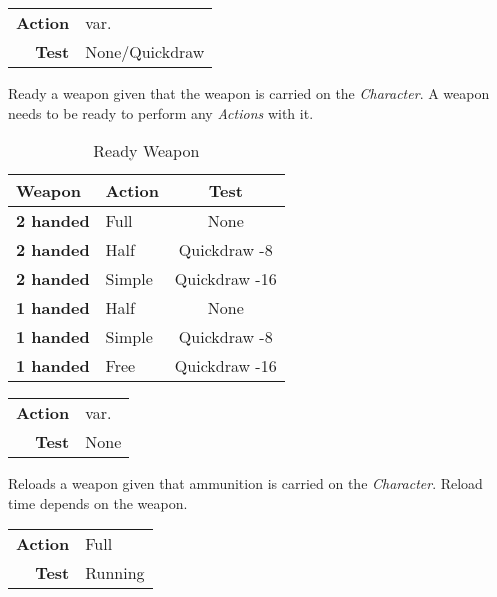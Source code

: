 \begin{tabular}{rl}
    \textbf{Action} & var.           \\
    \textbf{Test}   & None/Quickdraw \\
\end{tabular}

\hfill

Ready a weapon given that the weapon is carried on the \emph{Character}.
A weapon needs to be ready to perform any \emph{Actions} with it.

\begin{table}[htb]
    \caption[Ready Weapon]{Ready Weapon}
    \label{tab:ready weapon}
    \centering
    \begin{tabular}{llc}
        \toprule
        \textbf{Weapon}   & \textbf{Action} & \textbf{Test} \\
        \midrule
        \textbf{2 handed} & Full            & None          \\
        \textbf{2 handed} & Half            & Quickdraw -8  \\
        \textbf{2 handed} & Simple          & Quickdraw -16 \\
        \textbf{1 handed} & Half            & None          \\
        \textbf{1 handed} & Simple          & Quickdraw -8  \\
        \textbf{1 handed} & Free            & Quickdraw -16 \\
        \bottomrule
    \end{tabular}
\end{table}


\begin{tabular}{rl}
    \textbf{Action} & var. \\
    \textbf{Test}   & None \\
\end{tabular}

\hfill

Reloads a weapon given that ammunition is carried on the \emph{Character}.
Reload time depends on the weapon.

\begin{tabular}{rl}
    \textbf{Action} & Full    \\
    \textbf{Test}   & Running \\
\end{tabular}

